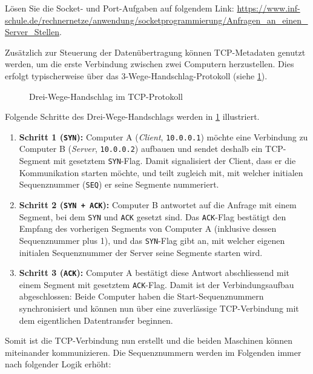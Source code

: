 \begin{mychallenge}
	Lösen Sie die Socket- und Port-Aufgaben auf folgendem Link: \url{https://www.inf-schule.de/rechnernetze/anwendung/socketprogrammierung/Anfragen_an_einen_Server_Stellen}.
\end{mychallenge}

Zusätzlich zur Steuerung der Datenübertragung können \gls{TCP}-Metadaten genutzt werden, um die erste Verbindung zwischen zwei Computern herzustellen. Dies erfolgt typischerweise über das 3-Wege-Handschlag-Protokoll (siehe \cref{fig:threewayHandshake}).

\begin{figure}[H]
	\centering
	
	\caption{Drei-Wege-Handschlag im \gls{TCP}-Protokoll}
	\label{fig:threewayHandshake}
\end{figure}
Folgende Schritte des Drei-Wege-Handschlags werden in \cref{fig:threewayHandshake} illustriert.
\begin{enumerate}
	\item \textbf{Schritt 1 (\texttt{SYN}):} Computer A (\textit{Client}, \texttt{10.0.0.1}) möchte eine Verbindung zu Computer B (\textit{Server}, \texttt{10.0.0.2}) aufbauen und sendet deshalb ein \gls{TCP}-Segment mit gesetztem \texttt{SYN}-Flag. Damit signalisiert der Client, dass er die Kommunikation starten möchte, und teilt zugleich mit, mit welcher initialen Sequenznummer (\texttt{SEQ}) er seine Segmente nummeriert.
	\item \textbf{Schritt 2 (\texttt{SYN + ACK}):} Computer B antwortet auf die Anfrage mit einem Segment, bei dem \texttt{SYN} und \texttt{ACK} gesetzt sind. Das \texttt{ACK}-Flag bestätigt den Empfang des vorherigen Segments von Computer A (inklusive dessen Sequenznummer plus 1), und das \texttt{SYN}-Flag gibt an, mit welcher eigenen initialen Sequenznummer der Server seine Segmente starten wird.
	\item \textbf{Schritt 3 (\texttt{ACK}):} Computer A bestätigt diese Antwort abschliessend mit einem Segment mit gesetztem \texttt{ACK}-Flag. Damit ist der Verbindungsaufbau abgeschlossen: Beide Computer haben die Start-Sequenznummern synchronisiert und können nun über eine zuverlässige \gls{TCP}-Verbindung mit dem eigentlichen Datentransfer beginnen.
\end{enumerate}
Somit ist die \gls{TCP}-Verbindung nun erstellt und die beiden Maschinen können miteinander kommunizieren. Die Sequenznummern werden im Folgenden immer nach folgender Logik erhöht:

